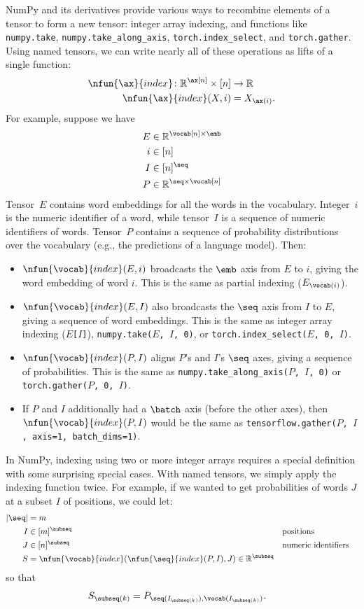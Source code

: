 NumPy and its derivatives provide various ways to recombine elements of a tensor to form a new tensor: integer array indexing, and functions like \verb|numpy.take|, \verb|numpy.take_along_axis|, \verb|torch.index_select|, and \verb|torch.gather|. Using named tensors, we can write nearly all of these operations as lifts of a single function:
\begin{align*}
  \nfun{\ax}{index} \colon \reals^{\ax[n]} \times [n] &\rightarrow \reals \\
  \nfun{\ax}{index}(X, i) &= X_{\ax(i)}.
\end{align*}
For example, suppose we have
\begin{align*}
  E &\in \reals^{\vocab[n] \times \emb} \\
  i &\in [n] \\
  I &\in [n]^{\seq} \\
  P &\in \reals^{\seq \times \vocab[n]}
\end{align*}
Tensor~$E$ contains word embeddings for all the words in the vocabulary. Integer~$i$ is the numeric identifier of a word, while tensor~$I$ is a sequence of numeric identifiers of words. Tensor~$P$ contains a sequence of probability distributions over the vocabulary (e.g., the predictions of a language model). Then:
\begin{itemize}
\item $\nfun{\vocab}{index}(E,i)$ broadcasts the $\emb$ axis from $E$ to $i$, giving the word embedding of word $i$. This is the same as partial indexing ($E_{\vocab(i)}$).
\item $\nfun{\vocab}{index}(E,I)$ also broadcasts the $\seq$ axis from $I$ to $E$, giving a sequence of word embeddings. This is the same as integer array indexing (\texttt{$E$[$I$]}), \texttt{numpy.take($E$, $I$, 0)}, or \texttt{torch.index\_select($E$, 0, $I$)}.
\item $\nfun{\vocab}{index}(P,I)$ aligns $P$'s and $I$'s $\seq$ axes, giving a sequence of probabilities. This is the same as \texttt{numpy.take\_along\_axis($P$, $I$, 0)} or \texttt{torch.gather($P$, 0, $I$)}.
\item If $P$ and $I$ additionally had a $\batch$ axis (before the other axes), then $\nfun{\vocab}{index}(P,I)$ would be the same as \texttt{tensorflow.gather($P$, $I$, axis=1, batch\_dims=1)}.
\end{itemize}

In NumPy, indexing using two or more integer arrays requires a special definition with some surprising special cases. With named tensors, we simply apply the indexing function twice. For example, if we wanted to get probabilities of words $J$ at a subset $I$ of positions, we could let:
\begin{align*}
  |\seq| &= m \\
  I &\in [m]^\subseq && \text{positions} \\
  J &\in [n]^\subseq && \text{numeric identifiers} \\
  S &= \nfun{\vocab}{index}(\nfun{\seq}{index}(P, I), J) \in \reals^{\subseq}
\end{align*}
so that
\begin{align*}
  S_{\subseq(k)} &= P_{\seq(I_{\subseq(k)}), \vocab(I_{\subseq(k)})}.
\end{align*}


